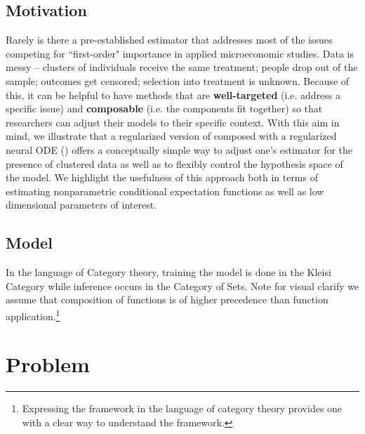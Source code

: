 \documentclass[a4paper,12pt]{article}
\begin{document}
\subsection{Motivation}
Rarely is there a pre-established estimator that addresses most of the issues competing for ``first-order" importance in applied microeconomic studies. Data is  messy -- clusters of individuals receive the same treatment; people drop out of the sample; outcomes get censored; selection into treatment is unknown. Because of this, it can be helpful to have methods that are \textbf{well-targeted} (i.e. address a specific issue) and \textbf{composable} (i.e. the components fit together) so that researchers can adjust their models to their specific context. With this aim in mind, we illustrate that a regularized version of \cite{finn2017model} composed with a regularized neural ODE (\cite{kelly2020learning}) offers a conceptually simple way to adjust one's estimator for the presence of clustered data as well as to flexibly control the hypothesis space of the model. We highlight the usefulness of this approach both in terms of estimating nonparametric conditional expectation functions as well as low dimensional parameters of interest.
\subsection{Model}
In the language of Category theory, training the model is done in the Kleisi Category while inference occurs in the Category of Sets. Note for visual clarify we assume that composition of functions is of higher precedence than function application.\footnote{Expressing the framework in the language of category theory provides one with a clear way to understand the framework.}

\section{Problem}
\end{document}

